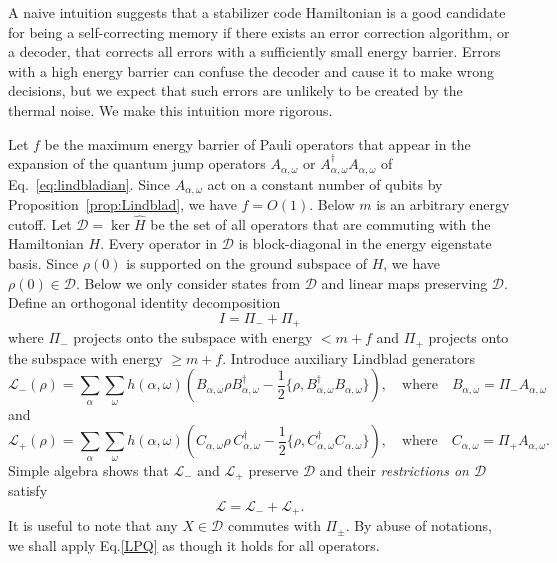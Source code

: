 A naive intuition suggests that a stabilizer code Hamiltonian 
is a good candidate for being a self-correcting memory
if there exists an error correction algorithm, or a decoder,
that corrects all errors with a sufficiently small energy barrier.
Errors with a high energy barrier can confuse the decoder
and cause it to make wrong decisions,
but we expect that such errors are unlikely to be created by the thermal noise.
We make this intuition more rigorous.


Let $f$ be the maximum energy barrier of Pauli operators that appear in the expansion of
the quantum jump operators $A_{\alpha,\omega}$ or $A_{\alpha,\omega}^\dag A_{\alpha,\omega}$
of Eq.~\eqref{eq:lindbladian}.
Since $A_{\alpha,\omega}$ act on a constant number of qubits 
by Proposition~\ref{prop:Lindblad}, we have $f=O(1)$.
Below $m$ is an arbitrary energy cutoff.
Let $\mathcal D = \ker \hat H$ be the set of all operators that are commuting with the Hamiltonian $H$.
Every operator in $\mathcal D$ is block-diagonal in the energy eigenstate basis.
Since $\rho(0)$ is supported on the ground subspace of $H$, we have $\rho(0) \in \mathcal D$.
Below we only consider states from $\mathcal D$ and linear maps preserving $\mathcal D$.
Define an orthogonal  identity decomposition
\[
I=\Pi_- + \Pi_+
\]
where $\Pi_-$ projects onto the subspace with energy $<m+f$
and $\Pi_+$ projects onto the subspace with energy $\ge m+f$.
Introduce auxiliary Lindblad generators
\begin{equation}
\mathcal L_-( \rho)=\sum_\alpha \sum_\omega h(\alpha,\omega) \left(
B_{\alpha,\omega} \rho B_{\alpha,\omega}^\dag - \frac12 \{  \rho,B_{\alpha,\omega}^\dag B_{\alpha,\omega} \} \right),
\quad \mbox{where} \quad B_{\alpha,\omega} = \Pi_- A_{\alpha,\omega}
\label{Lp}
\end{equation}
and
\begin{equation}
\mathcal L_+( \rho)=\sum_\alpha \sum_\omega h(\alpha,\omega) \left(
C_{\alpha,\omega} \rho\,  C_{\alpha,\omega}^\dag - \frac12 \{  \rho,C_{\alpha,\omega}^\dag C_{\alpha,\omega} \} \right),
\quad \mbox{where} \quad C_{\alpha,\omega} = \Pi_+ A_{\alpha,\omega}.
\label{Lq}
\end{equation}
Simple algebra shows that $\mathcal L_-$ and $\mathcal L_+$ preserve $\mathcal D$ and
their \emph{restrictions on $\mathcal D$} satisfy
\begin{equation}
\label{LPQ}
\mathcal L=\mathcal L_- + \mathcal L_+.
\end{equation}
It is useful to note that any $X \in \mathcal D$ commutes with $\Pi_\pm$.
By abuse of notations, we shall apply Eq.\eqref{LPQ} as though it holds for all operators.



